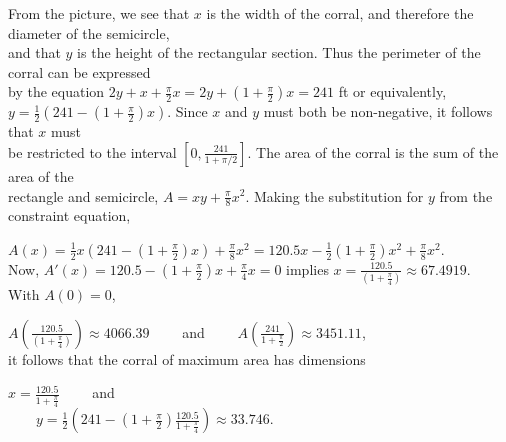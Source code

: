 \begin{enumerate}[1.]
\begin{multicols}{2}
\begin{Solution}
\par 
From the picture, we see that \(x\) is the width of the corral, and therefore the diameter of the semicircle, \leavevmode\\\relax  and that \(y\) is the height of the rectangular section. Thus the perimeter of the corral can be expressed \leavevmode\\\relax 
by the equation \(2y+ x+ \frac{\pi}{2}x= 2y + (1+ \frac{\pi}{2})x= 241\) ft or equivalently, \leavevmode\\\relax 
\(y=\frac{1}{2}(241 - (1+ \frac{\pi}{2})x)\). Since \(x\) and \(y\) must both be non-negative, it follows that \(x\) must \leavevmode\\\relax 
be restricted to the interval \([0, \frac{241}{1+ \pi/2}]\). The area of the corral is the sum of the area of the \leavevmode\\\relax 
rectangle and semicircle, \(A= xy + \frac{\pi}{8}x^2\). Making the substitution for \(y\) from the \leavevmode\\\relax 
constraint equation, \par 
\(A(x)=\frac{1}{2}x(241 - (1+ \frac{\pi}{2})x) + \frac{\pi}{8}x^2 = 120.5 x - \frac{1}{2}(1+ \frac{\pi}{2})x^2 + \frac{\pi}{8}x^2\). \leavevmode\\\relax 
Now, \(A'(x) = 120.5 - (1 + \frac{\pi}{2})x + \frac{\pi}{4}x = 0\) implies \(x= \frac{120.5}{(1+ \frac{\pi}{4})} \approx 67.4919\).  \leavevmode\\\relax 
With \(A(0)=0\), \par 
\(A(\frac{120.5}{(1+ \frac{\pi}{4})}) \approx 4066.39 \qquad\) and \(\qquad A(\frac{241}{1+ \frac{\pi}{2}}) \approx 3451.11\), \leavevmode\\\relax 
it follows that the corral of maximum area has dimensions \par 
\(x= \frac{120.5}{1+ \frac{\pi}{4}} \qquad\) and \\
\(\qquad y= \frac{1}{2}(241 - (1+ \frac{\pi}{2}) \frac{120.5}{1+ \frac{\pi}{4}}) \approx 33.746\).
\par\end{Solution}
 
 

\end{multicols}
\end{enumerate}
